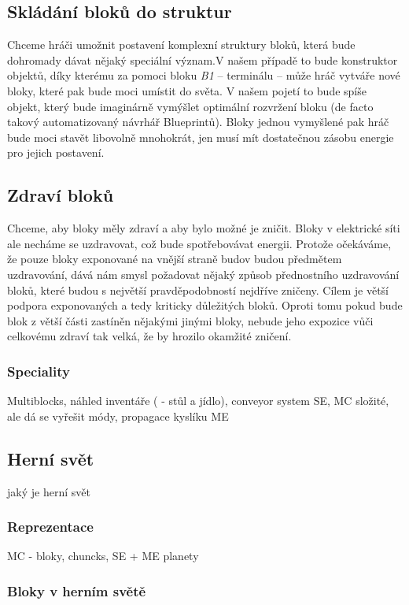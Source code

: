 \subsection{Skládání bloků do struktur}
Chceme hráči umožnit postavení komplexní struktury bloků, která bude dohromady dávat nějaký speciální význam.V našem případě to bude konstruktor objektů, díky kterému za pomoci bloku \textit{B1} -- terminálu -- může hráč vytváře nové bloky, které pak bude moci umístit do světa. V našem pojetí to bude spíše objekt, který bude imaginárně vymýšlet optimální rozvržení bloku (de facto takový automatizovaný návrhář Blueprintů). Bloky jednou vymyšlené pak hráč bude moci stavět libovolně mnohokrát, jen musí mít dostatečnou zásobu energie pro jejich postavení.

\subsection{Zdraví bloků}
Chceme, aby bloky měly zdraví a aby bylo možné je zničit. Bloky v elektrické síti ale necháme se uzdravovat, což bude spotřebovávat energii. Protože očekáváme, že pouze bloky exponované na vnější straně budov budou předmětem uzdravování, dává nám smysl požadovat nějaký způsob přednostního uzdravování bloků, které budou s největší pravděpodobností nejdříve zničeny. Cílem je větší podpora exponovaných a tedy kriticky důležitých bloků. Oproti tomu pokud bude blok z větší části zastíněn nějakými jinými bloky, nebude jeho expozice vůči celkovému zdraví tak velká, že by hrozilo okamžité zničení.

\subsubsection{Speciality}
Multiblocks, náhled inventáře (\ME{} - stůl a jídlo), conveyor system SE, MC složité, ale dá se vyřešit módy, propagace kyslíku ME

\subsection{Herní svět}

jaký je herní svět

\subsubsection{Reprezentace}

MC - bloky, chuncks, SE + ME planety

\subsubsection{Bloky v herním světě}

